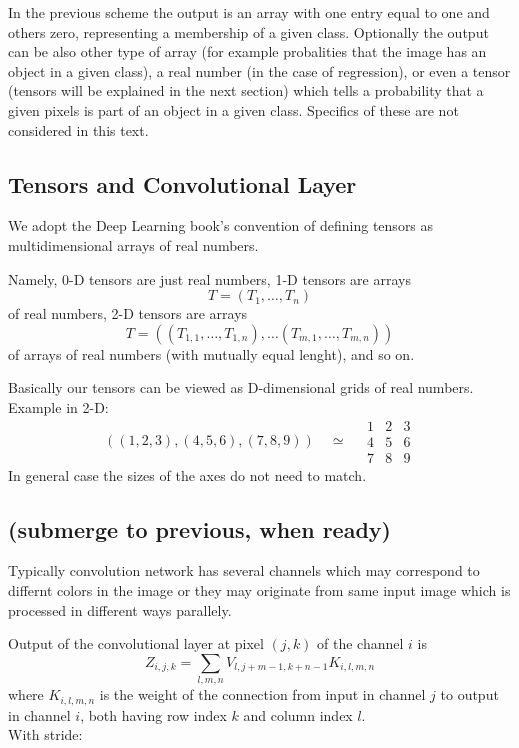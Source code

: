 \documentclass[]{article}
\begin{document}
In the previous scheme the output is an array with one entry equal to one and others
zero, representing a membership of a given class. Optionally the output can be
also other type of array (for example probalities that the image has an object
in a given class), a real number (in the case of regression), or even a
tensor (tensors will be explained in the next section) which tells a probability
that a given pixels is part of an object in a given class. Specifics of these are
not considered in this text.

\subsection{Tensors and Convolutional Layer}
We adopt the Deep Learning book's convention of defining tensors as
multidimensional arrays of real numbers.

Namely, 0-D tensors are just real numbers, 1-D tensors are arrays
\[
T = (T_1, \ldots, T_n)
\]
of real numbers, 2-D tensors are arrays
\[
T = ((T_{1,1}, \ldots, T_{1,n}), \ldots (T_{m,1}, \ldots, T_{m,n}))
\]
of arrays of real numbers (with mutually equal lenght), and so on.

Basically our tensors can be viewed as D-dimensional grids of real numbers.
Example in 2-D:
\[
((1, 2, 3), (4, 5, 6), (7, 8, 9)) \quad \simeq \quad
\begin{array}{c|c|c}
  1 & 2 & 3 \\
  \hline
  4 & 5 & 6 \\
  \hline
  7 & 8 & 9
 \end{array}
\]
In general case the sizes of the axes do not need to match.


\subsection{(submerge to previous, when ready)}
Typically convolution network has several channels which may correspond to differnt
colors in the image or they may originate from same input image which is processed
in different ways parallely.

Output of the convolutional layer at pixel $(j, k)$ of the channel $i$ is
\[
Z_{i, j, k} = \sum_{l, m, n} V_{l, j + m -1, k + n -1} K_{i, l, m, n}
\]
where $K_{i, l, m, n}$ is the weight of the connection from input in channel $j$
to output in channel $i$, both having row index $k$ and column index $l$.\\
With stride:
\end{document}
